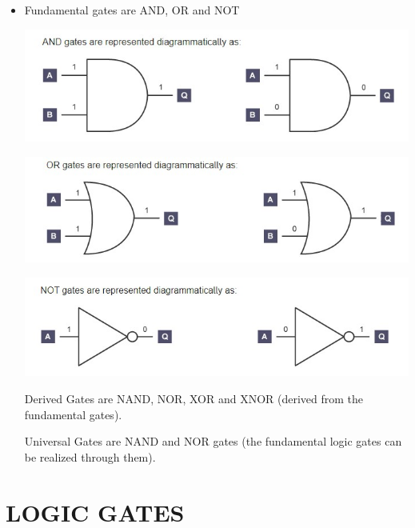 \documentclass{article}
\begin{document}
\begin{itemize}
		\item Fundamental gates are \color{red}AND, OR \color{black}and \color{red}NOT \\
		\begin{center}
			\includegraphics{pic3}
		\end{center}
		
		\begin{center}
	    \includegraphics{pic3.1}
        \end{center}	
		
		\begin{center}
		\includegraphics{pic3.2}
		\end{center}
		
		\color{black}Derived Gates are \color{red}NAND, NOR, XOR \color{black}and \color{red}XNOR \color{black}(derived from the fundamental gates).
		
		Universal Gates are \color{red}NAND \color{black} and \color{red}NOR \color{black}gates (the fundamental logic gates can be realized through them).
		
		
	\end{itemize}
\section{LOGIC GATES}
\end{document}
